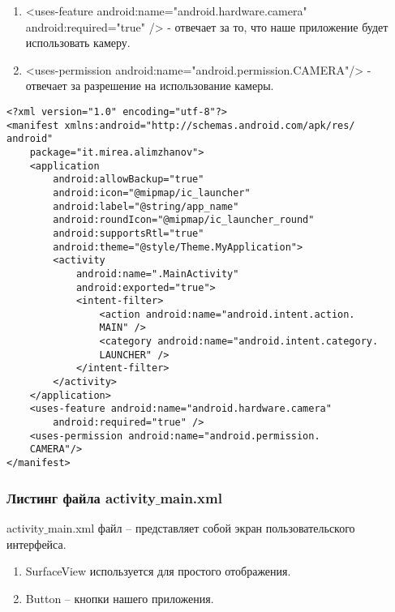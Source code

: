 \begin{enumerate}
\item <uses-feature android:name="android.hardware.camera" android:required=\newline"true" /> - отвечает за то, что наше приложение будет использовать камеру.
\item <uses-permission android:name="android.permission.CAMERA"/> - отвечает за разрешение на использование камеры.
\end{enumerate}

\begin{verbatim}
<?xml version="1.0" encoding="utf-8"?>
<manifest xmlns:android="http://schemas.android.com/apk/res/
android"
    package="it.mirea.alimzhanov">
    <application
        android:allowBackup="true"
        android:icon="@mipmap/ic_launcher"
        android:label="@string/app_name"
        android:roundIcon="@mipmap/ic_launcher_round"
        android:supportsRtl="true"
        android:theme="@style/Theme.MyApplication">
        <activity
            android:name=".MainActivity"
            android:exported="true">
            <intent-filter>
                <action android:name="android.intent.action.
                MAIN" />
                <category android:name="android.intent.category.
                LAUNCHER" />
            </intent-filter>
        </activity>
    </application>
    <uses-feature android:name="android.hardware.camera"
        android:required="true" />
    <uses-permission android:name="android.permission.
    CAMERA"/>
</manifest>
\end{verbatim}



\subsubsection{Листинг файла activity$\_$main.xml}

activity$\_$main.xml файл – представляет собой экран пользовательского интерфейса.

\begin{enumerate}
\item SurfaceView используется для простого отображения.
\item Button – кнопки нашего приложения.
\end{enumerate}

